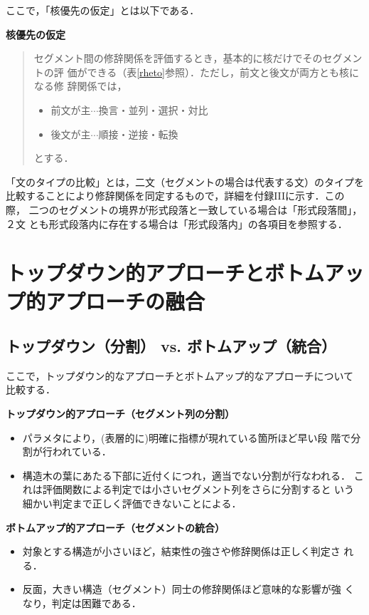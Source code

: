 ここで，「核優先の仮定」とは以下である．
\begin{description}
\item{\bf 核優先の仮定}
\begin{quote}
セグメント間の修辞関係を評価するとき，基本的に核だけでそのセグメントの評
価ができる（表\ref{rheto}参照）．ただし，前文と後文が両方とも核になる修
辞関係では，
      \begin{itemize}
       \item 前文が主$\cdots$換言・並列・選択・対比
       \item 後文が主$\cdots$順接・逆接・転換
      \end{itemize}
とする．
\end{quote}
\end{description}

「文のタイプの比較」とは，二文（セグメントの場合は代表する文）のタイプを
比較することにより修辞関係を同定するもので，詳細を付録IIIに示す．この際，
二つのセグメントの境界が形式段落と一致している場合は「形式段落間」，２文
とも形式段落内に存在する場合は「形式段落内」の各項目を参照する．

\section{トップダウン的アプローチとボトムアップ的アプローチの融合}

\subsection{トップダウン（分割） vs. ボトムアップ（統合）}

ここで，トップダウン的なアプローチとボトムアップ的なアプローチについて
比較する．

\begin{description}
\item{\bf トップダウン的アプローチ（セグメント列の分割）}
\begin{itemize}
 \item パラメタにより，(表層的に)明確に指標が現れている箇所ほど早い段
       階で分割が行われている．
 \item 構造木の葉にあたる下部に近付くにつれ，適当でない分割が行なわれる．
       これは評価関数による判定では小さいセグメント列をさらに分割すると
       いう細かい判定まで正しく評価できないことによる．
\end{itemize}
\item{\bf ボトムアップ的アプローチ（セグメントの統合）}
\begin{itemize}
 \item 対象とする構造が小さいほど，結束性の強さや修辞関係は正しく判定さ
       れる．
 \item 反面，大きい構造（セグメント）同士の修辞関係ほど意味的な影響が強
       くなり，判定は困難である．
\end{itemize}
\end{description}

